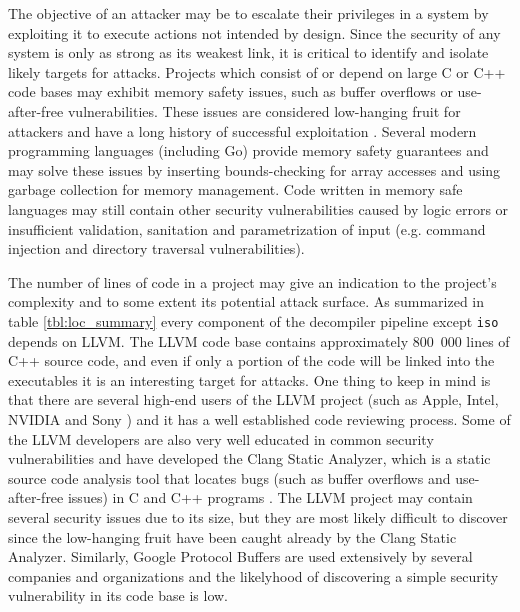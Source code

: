 The objective of an attacker may be to escalate their privileges in a system by exploiting it to execute actions not intended by design. Since the security of any system is only as strong as its weakest link, it is critical to identify and isolate likely targets for attacks. Projects which consist of or depend on large C or C++ code bases may exhibit memory safety issues, such as buffer overflows or use-after-free vulnerabilities. These issues are considered low-hanging fruit for attackers and have a long history of successful exploitation \cite{for_fun_and_profit}. Several modern programming languages (including Go) provide memory safety guarantees and may solve these issues by inserting bounds-checking for array accesses and using garbage collection for memory management. Code written in memory safe languages may still contain other security vulnerabilities caused by logic errors or insufficient validation, sanitation and parametrization of input (e.g. command injection and directory traversal vulnerabilities).

The number of lines of code in a project may give an indication to the project's complexity and to some extent its potential attack surface. As summarized in table \ref{tbl:loc_summary} every component of the decompiler pipeline except \texttt{iso} depends on LLVM. The LLVM code base contains approximately 800~000 lines of C++ source code, and even if only a portion of the code will be linked into the executables it is an interesting target for attacks. One thing to keep in mind is that there are several high-end users of the LLVM project (such as Apple, Intel, NVIDIA and Sony \cite{llvm_users}) and it has a well established code reviewing process. Some of the LLVM developers are also very well educated in common security vulnerabilities and have developed the Clang Static Analyzer, which is a static source code analysis tool that locates bugs (such as buffer overflows and use-after-free issues) in C and C++ programs \cite{clang_analyzer}. The LLVM project may contain several security issues due to its size, but they are most likely difficult to discover since the low-hanging fruit have been caught already by the Clang Static Analyzer. Similarly, Google Protocol Buffers are used extensively by several companies and organizations and the likelyhood of discovering a simple security vulnerability in its code base is low.

